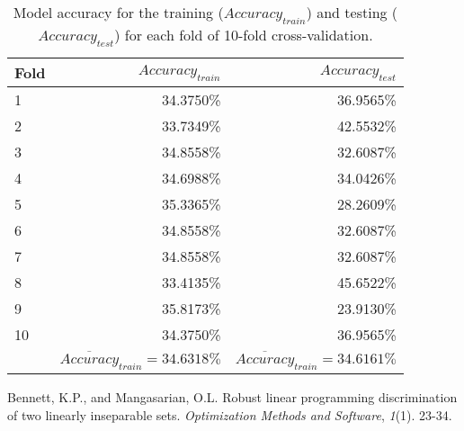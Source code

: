 \documentclass[11pt]{article}
\begin{document}
\begin{enumerate}
\begin{table}[h]
\begin{center}
\begin{tabular}{lrr}
Fold &	$Accuracy_{train}$ &	$Accuracy_{test}$ \\ \hline
1  &	34.3750\% &	36.9565\% \\
2  &	33.7349\% &	42.5532\% \\
3  &	34.8558\% &	32.6087\% \\
4  &	34.6988\% &	34.0426\% \\
5  &	35.3365\% &	28.2609\% \\
6  &	34.8558\% &	32.6087\% \\
7  &	34.8558\% &	32.6087\% \\
8  &	33.4135\% &	45.6522\% \\
9  &	35.8173\% &	23.9130\% \\
10 &	34.3750\% &	36.9565\% \\
	& $\overline{Accuracy}_{train}=34.6318\%$ &	$\overline{Accuracy}_{train}=34.6161\%$ \\
\end{tabular}
\caption{Model accuracy for the training ($Accuracy_{train}$) and testing ($Accuracy_{test}$) for each fold of 10-fold cross-validation.}
\end{center}
\label{tbl:q5-results}
\end{table}

\end{enumerate}

\begin{thebibliography}{1}

 Bennett, K.P., and Mangasarian, O.L. Robust linear programming discrimination of two linearly inseparable sets. \textit{Optimization Methods and Software}, \textit{1}(1). 23-34.

\end{thebibliography}
\end{document}
